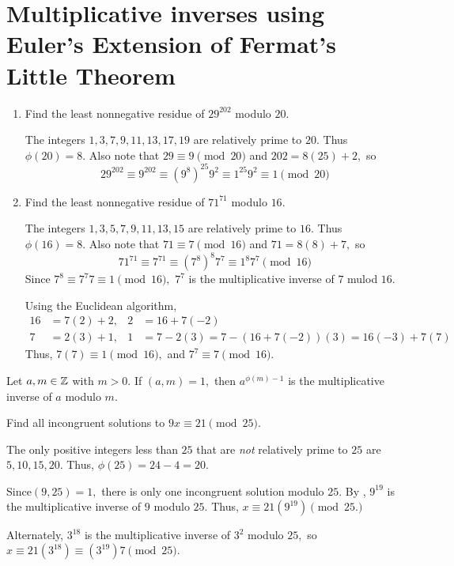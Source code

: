 \documentclass{ximera}
\begin{document}

\section{Multiplicative inverses using Euler's Extension of Fermat's Little Theorem}

\begin{example}\label{ex-euler-solve-cong}
 
  \begin{enumerate}
    \item Find the least nonnegative residue of $29^{202}$ modulo $20$. 
    
    The integers $1,3,7,9,11,13,17,19$ are relatively prime to $20.$ Thus $\phi(20)=8.$ Also note that $29\equiv 9\pmod{20}$ and $202=8(25)+2,$ so 
    \[29^{202}\equiv 9^{202}\equiv(9^8)^{25} 9^2\equiv 1^{25} 9^2\equiv 1\pmod{20}\] 
    
    \item Find the least nonnegative residue of $71^{71}$ modulo $16$.
    
    The integers $1,3,5,7,9,11,13,15$ are relatively prime to $16.$ Thus $\phi(16)=8.$ Also note that $71\equiv 7\pmod{16}$ and $71=8(8)+7,$ so 
      \[71^{71}\equiv 7^{71}\equiv(7^8)^{8} 7^7\equiv 1^{8} 7^7\pmod{16}\] 
      Since $7^8\equiv 7^7 7\equiv 1\pmod{16},$ $7^7$ is the multiplicative inverse of $7$ mulod $16.$

    Using the Euclidean algorithm, 
    \begin{align*}
      16	& = 7(2) + 2,	&2&=16+7(-2)\\
      7	& = 2(3) + 1,	&1&=7-2(3)=7-(16+7(-2))(3)=16(-3)+7(7)
    \end{align*}
    Thus, $7(7)\equiv 1\pmod{16},$ and $7^7\equiv 7\pmod{16}.$
  \end{enumerate}
\end{example}

\begin{corollary}\label{cor:inv-euler}
  Let $a,m\in\mathbb Z$ with $m>0.$  If $(a,m)=1,$ then $a^{\phi(m)-1}$ is the multiplicative inverse of $a$ modulo $m$.
\end{corollary}

\begin{example}
  Find all incongruent solutions to $9x\equiv 21\pmod{25}$.
  
  The only positive integers less than $25$ that are \emph{not} relatively prime to $25$ are $5,10,15,20$. Thus, $\phi(25)=24-4=20.$

  Since$(9,25)=1,$ there is only one  incongruent solution  modulo $25.$ By , $9^{19}$ is the multiplicative inverse of $9$ modulo ${25}$. Thus, $x\equiv 21(9^{19})\pmod{25.}$

  Alternately, $3^{18}$ is the multiplicative inverse of $3^2$ modulo ${25},$ so $x\equiv 21(3^{18})\equiv  (3^{19})7\pmod{25}.$
\end{example}
\end{document}
